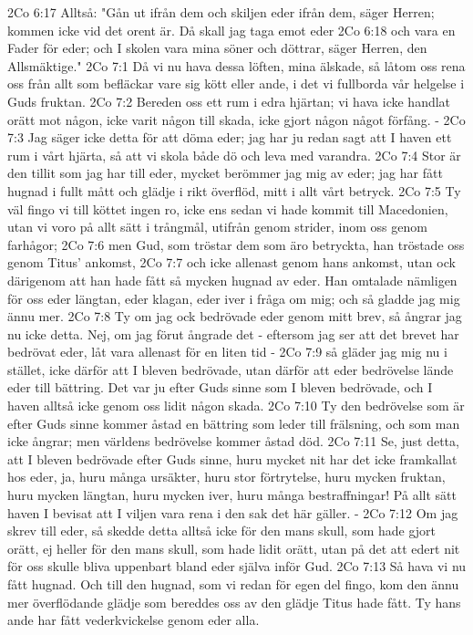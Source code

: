 2Co 6:17  Alltså: "Gån ut ifrån dem och skiljen eder ifrån dem, säger Herren; kommen icke vid det orent är. Då skall jag taga emot eder
2Co 6:18  och vara en Fader för eder; och I skolen vara mina söner och döttrar, säger Herren, den Allsmäktige."
2Co 7:1  Då vi nu hava dessa löften, mina älskade, så låtom oss rena oss från allt som befläckar vare sig kött eller ande, i det vi fullborda vår helgelse i Guds fruktan.
2Co 7:2  Bereden oss ett rum i edra hjärtan; vi hava icke handlat orätt mot någon, icke varit någon till skada, icke gjort någon något förfång. -
2Co 7:3  Jag säger icke detta för att döma eder; jag har ju redan sagt att I haven ett rum i vårt hjärta, så att vi skola både dö och leva med varandra.
2Co 7:4  Stor är den tillit som jag har till eder, mycket berömmer jag mig av eder; jag har fått hugnad i fullt mått och glädje i rikt överflöd, mitt i allt vårt betryck.
2Co 7:5  Ty väl fingo vi till köttet ingen ro, icke ens sedan vi hade kommit till Macedonien, utan vi voro på allt sätt i trångmål, utifrån genom strider, inom oss genom farhågor;
2Co 7:6  men Gud, som tröstar dem som äro betryckta, han tröstade oss genom Titus' ankomst,
2Co 7:7  och icke allenast genom hans ankomst, utan ock därigenom att han hade fått så mycken hugnad av eder. Han omtalade nämligen för oss eder längtan, eder klagan, eder iver i fråga om mig; och så gladde jag mig ännu mer.
2Co 7:8  Ty om jag ock bedrövade eder genom mitt brev, så ångrar jag nu icke detta. Nej, om jag förut ångrade det - eftersom jag ser att det brevet har bedrövat eder, låt vara allenast för en liten tid -
2Co 7:9  så gläder jag mig nu i stället, icke därför att I bleven bedrövade, utan därför att eder bedrövelse lände eder till bättring. Det var ju efter Guds sinne som I bleven bedrövade, och I haven alltså icke genom oss lidit någon skada.
2Co 7:10  Ty den bedrövelse som är efter Guds sinne kommer åstad en bättring som leder till frälsning, och som man icke ångrar; men världens bedrövelse kommer åstad död.
2Co 7:11  Se, just detta, att I bleven bedrövade efter Guds sinne, huru mycket nit har det icke framkallat hos eder, ja, huru många ursäkter, huru stor förtrytelse, huru mycken fruktan, huru mycken längtan, huru mycken iver, huru många bestraffningar! På allt sätt haven I bevisat att I viljen vara rena i den sak det här gäller. -
2Co 7:12  Om jag skrev till eder, så skedde detta alltså icke för den mans skull, som hade gjort orätt, ej heller för den mans skull, som hade lidit orätt, utan på det att edert nit för oss skulle bliva uppenbart bland eder själva inför Gud.
2Co 7:13  Så hava vi nu fått hugnad. Och till den hugnad, som vi redan för egen del fingo, kom den ännu mer överflödande glädje som bereddes oss av den glädje Titus hade fått. Ty hans ande har fått vederkvickelse genom eder alla.

